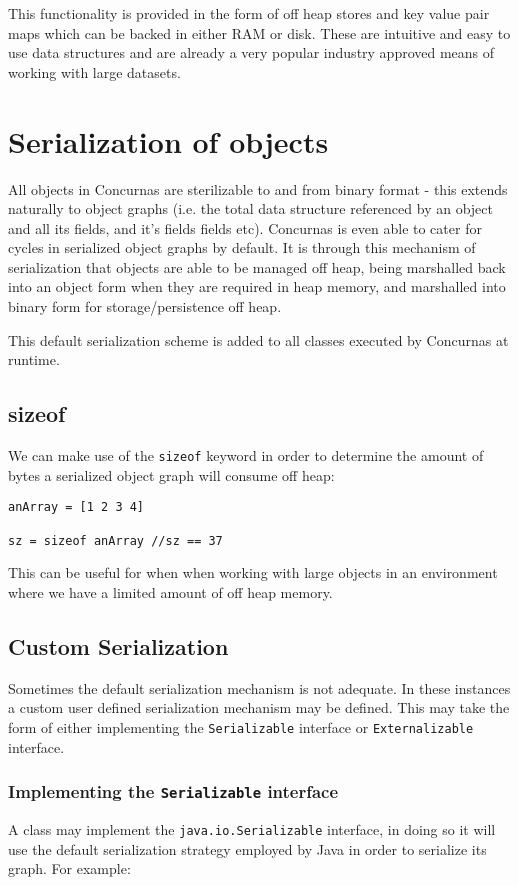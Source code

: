 \documentclass[conc-doc]{subfiles}
\begin{document}
This functionality is provided in the form of off heap stores and key value pair maps which can be backed in either RAM or disk. These are intuitive and easy to use data structures and are already a very popular industry approved means of working with large datasets.

\section{Serialization of objects}
All objects in Concurnas are sterilizable to and from binary format - this extends naturally to object graphs (i.e. the total data structure referenced by an object and all its fields, and it's fields fields etc). Concurnas is even able to cater for cycles in serialized object graphs by default. It is through this mechanism of serialization that objects are able to be managed off heap, being marshalled back into an object form when they are required in heap memory, and marshalled into binary form for storage/persistence off heap.

This default serialization scheme is added to all classes executed by Concurnas at runtime.

\subsection{sizeof}
We can make use of the \lstinline{sizeof} keyword in order to determine the amount of bytes a serialized object graph will consume off heap:

\begin{lstlisting}
anArray = [1 2 3 4]

sz = sizeof anArray //sz == 37
\end{lstlisting}

This can be useful for when when working with large objects in an environment where we have a limited amount of off heap memory.

\subsection{Custom Serialization}
Sometimes the default serialization mechanism is not adequate. In these instances a custom user defined serialization mechanism may be defined. This may take the form of either implementing the \lstinline{Serializable} interface or \lstinline{Externalizable} interface.


\subsubsection{Implementing the \lstinline{Serializable} interface}
A class may implement the \lstinline{java.io.Serializable} interface, in doing so it will use the default serialization strategy employed by Java in order to serialize its graph. For example:
\end{document}
